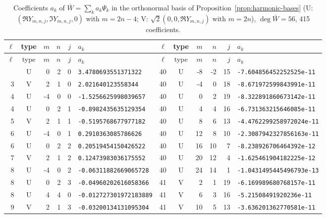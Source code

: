 \begin{longtable}{rcrrrl|rcrrrl}
\caption{Coefficients $a_k$ of $\bar W=\sum_k a_k\Psi_k$ in the orthonormal basis of Proposition~\ref{prop:harmonic-bases} (U: $(\Re Y_{m,n,j},\Im Y_{m,n,j},0)$ with $m=2n-4$; V: $\sqrt2(0,0,\Re Y_{m,n,j})$ with $m=2n$), $\deg\bar W=56$, 415 coefficients.}\label{tab:coefficients}\\
\toprule
$\ell$ & type & $m$ & $n$ & $j$ & $a_k$ & $\ell$ & type & $m$ & $n$ & $j$ & $a_k$\\
\midrule
\endfirsthead
\toprule
$\ell$ & type & $m$ & $n$ & $j$ & $a_k$ & $\ell$ & type & $m$ & $n$ & $j$ & $a_k$\\
\midrule
\endhead
\bottomrule
\endfoot
2 & U & 0 & 2 & 0 & \texttt{3.4780693551371322} & 40 & U & -8 & -2 & 15 & \texttt{-7.604856452252525e-11}\\
3 & V & 2 & 1 & 0 & \texttt{2.021640123558344} & 40 & U & -4 & 0 & 18 & \texttt{-8.671972599843991e-11}\\
4 & U & -4 & 0 & 0 & \texttt{-1.5256625998039657} & 40 & U & 0 & 2 & 19 & \texttt{-8.322891860673142e-11}\\
4 & U & 0 & 2 & 1 & \texttt{-0.8982435635129354} & 40 & U & 4 & 4 & 16 & \texttt{-6.731363215646085e-11}\\
5 & V & 2 & 1 & 1 & \texttt{-0.5195768677977182} & 40 & U & 8 & 6 & 13 & \texttt{-4.4762299258972024e-11}\\
6 & U & -4 & 0 & 1 & \texttt{0.2910363085786626} & 40 & U & 12 & 8 & 10 & \texttt{-2.3087942327856163e-11}\\
6 & U & 0 & 2 & 2 & \texttt{0.20519454150426522} & 40 & U & 16 & 10 & 7 & \texttt{-8.238926706464392e-12}\\
7 & V & 2 & 1 & 2 & \texttt{0.12473983036175552} & 40 & U & 20 & 12 & 4 & \texttt{-1.625461904182225e-12}\\
8 & U & -4 & 0 & 2 & \texttt{-0.06311882669065728} & 40 & U & 24 & 14 & 1 & \texttt{-1.0431495445496793e-13}\\
8 & U & 0 & 2 & 3 & \texttt{-0.04960202616058366} & 41 & V & 2 & 1 & 19 & \texttt{-6.169989680768157e-11}\\
8 & U & 4 & 4 & 0 & \texttt{-0.012727301972183889} & 41 & V & 6 & 3 & 16 & \texttt{-5.21508491920236e-11}\\
9 & V & 2 & 1 & 3 & \texttt{-0.03200134131095304} & 41 & V & 10 & 5 & 13 & \texttt{-3.636201362770581e-11}\\

\end{longtable}
